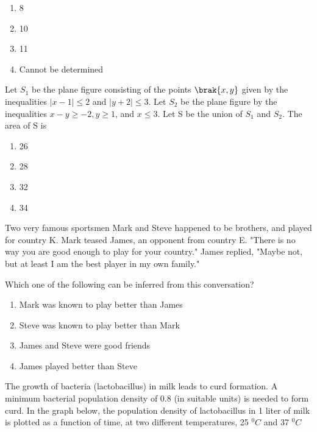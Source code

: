 \begin{enumerate}
    \item 8
    \item 10
    \item 11
    \item Cannot be determined
\end{enumerate}
\item Let $S_1$ be the plane figure consisting of the points $\brak{x, y}$ given by the inequalities $|x-1| \leq 2$ and $|y+2|\leq 3$. Let $S_2$ be the plane figure by the inequalities $x-y \geq -2, y \geq 1$, and $x \leq 3$. Let S be the union of $S_1$ and $S_2$. The area of S is
\begin{enumerate}
    \item 26
    \item 28
    \item 32
    \item 34
\end{enumerate}
\item Two very famous sportsmen Mark and Steve happened to be brothers, and played for country K. Mark teased James, an opponent from country E. "There is no way you are good enough to play for your country." James replied, "Maybe not, but at least I am the best player in my own family."

Which one of the following can be inferred from this conversation?
\begin{enumerate}
    \item Mark was known to play better than James
    \item Steve was known to play better than Mark 
    \item James and Steve were good friends
    \item James played better than Steve
\end{enumerate}
\item The growth of bacteria (lactobacillus) in milk leads to curd formation. A minimum bacterial population density of 0.8 (in suitable units) is needed to form curd. In the graph below, the population density of lactobacillus in 1 liter of milk is plotted as a function of time, at two different temperatures, 25 $^{0}C$ and 37 $^{0}C$\\

